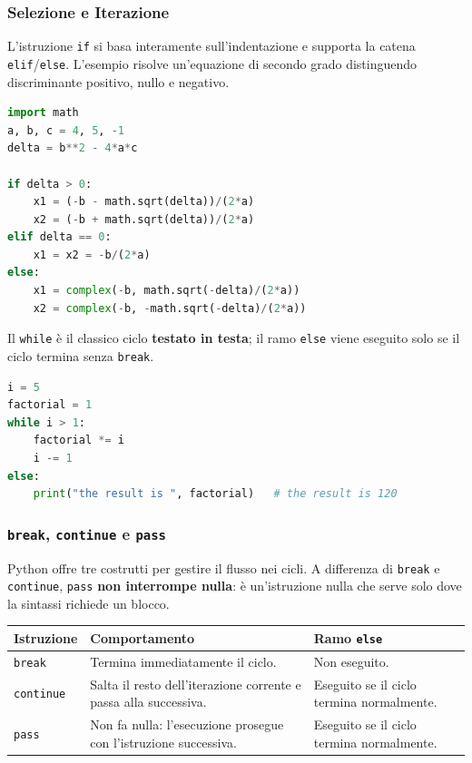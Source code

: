\documentclass[12pt]{extarticle}
\begin{document}
\subsubsection{Selezione e Iterazione}

\noindent L'istruzione \texttt{if} si basa interamente sull'indentazione e supporta la catena \texttt{elif}/\texttt{else}. L'esempio risolve un'equazione di secondo grado distinguendo discriminante positivo, nullo e negativo.

\begin{lstlisting}[language=Python]
import math
a, b, c = 4, 5, -1
delta = b**2 - 4*a*c

if delta > 0:
    x1 = (-b - math.sqrt(delta))/(2*a)
    x2 = (-b + math.sqrt(delta))/(2*a)
elif delta == 0:
    x1 = x2 = -b/(2*a)
else:
    x1 = complex(-b, math.sqrt(-delta)/(2*a))
    x2 = complex(-b, -math.sqrt(-delta)/(2*a))
\end{lstlisting}

\noindent Il \texttt{while} è il classico ciclo \textbf{testato in testa}; il ramo \texttt{else} viene eseguito solo se il ciclo termina senza \texttt{break}.

\begin{lstlisting}[language=Python]
i = 5
factorial = 1
while i > 1:
    factorial *= i
    i -= 1
else:
    print("the result is ", factorial)   # the result is 120
\end{lstlisting}

\subsubsection{\texttt{break}, \texttt{continue} e \texttt{pass}}

\noindent Python offre tre costrutti per gestire il flusso nei cicli. A differenza di \texttt{break} e \texttt{continue}, \texttt{pass} \textbf{non interrompe nulla}: è un'istruzione nulla che serve solo dove la sintassi richiede un blocco.

\begin{center}
\small
\begin{tabular}{p{2.2cm}p{8.4cm}p{2.8cm}}
    \toprule
    \textbf{Istruzione} & \textbf{Comportamento} & \textbf{Ramo \texttt{else}} \\
    \midrule
    \texttt{break} & Termina immediatamente il ciclo. & Non eseguito. \\
    \addlinespace
    \texttt{continue} & Salta il resto dell'iterazione corrente e passa alla successiva. & Eseguito se il ciclo termina normalmente. \\
    \addlinespace
    \texttt{pass} & Non fa nulla: l'esecuzione prosegue con l'istruzione successiva. & Eseguito se il ciclo termina normalmente. \\
    \bottomrule
\end{tabular}
\end{center}
\end{document}

